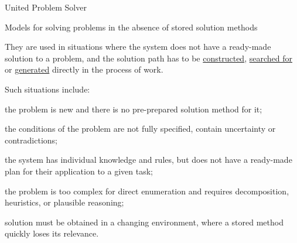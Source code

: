 \begin{frame}{United Problem Solver}
	\topline
	\justifying
	\vspace*{\fill}\\
	\small{
		\begin{SCn}
		\end{SCn}
	}
\end{frame}

\begin{frame}{Models for solving problems in the absence of stored solution methods}
	\topline
	\justifying
	
	\footnotesize
	\vspace{10mm}
	
	They are used in situations where the system does not have a ready-made solution to a problem, and the solution path has to be \uline{constructed}, \uline{searched for} or \uline{generated} directly in the process of work.
	
	Such situations include:
	\begin{textitemize}
		\item the problem is new and there is no pre-prepared solution method for it;
		\item the conditions of the problem are not fully specified, contain uncertainty or contradictions;
		\item the system has individual knowledge and rules, but does not have a ready-made plan for their application to a given task;
		\item the problem is too complex for direct enumeration and requires decomposition, heuristics, or plausible reasoning;
		\item solution must be obtained in a changing environment, where a stored method quickly loses its relevance.
	\end{textitemize}
\end{frame}

